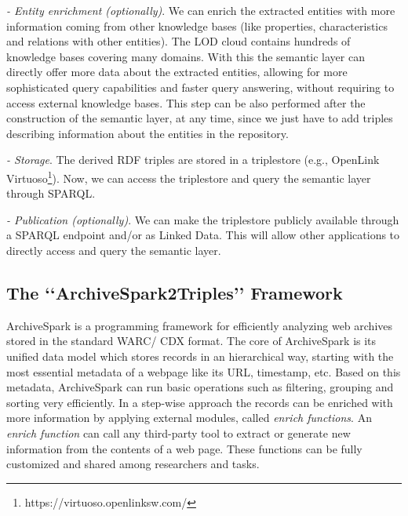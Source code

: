 \documentclass{libtex/sig-alternate-05-2015}
\newcommand{\q}[1]{\lq\lq{}{}#1\rq\rq{}{}}
\begin{document}
\vspace{0.5mm} \noindent
{\em - Entity enrichment (optionally)}.
We can enrich the extracted entities with more
information coming from other knowledge bases
(like properties, characteristics and relations with other entities).
The LOD cloud contains hundreds of knowledge bases covering many domains.
With this the semantic layer can directly offer more data about the extracted entities,
allowing for more sophisticated query capabilities
and faster query answering, without requiring
to access external knowledge bases.
This step can be also performed after the construction
of the semantic layer, at any time, since we
just have to add triples describing information about
the entities in the repository.

\vspace{0.5mm} \noindent
{\em - Storage}.
The derived RDF triples are stored in a triplestore
(e.g., OpenLink Virtuoso\footnote{https://virtuoso.openlinksw.com/}).
Now, we can access the triplestore and query the semantic layer
through SPARQL.

\vspace{0.5mm} \noindent
{\em - Publication (optionally)}.
We can make the triplestore publicly available through
a SPARQL endpoint and/or as Linked Data.
This will allow other applications to directly access and query
the semantic layer.



\subsection{The \q{ArchiveSpark2Triples} Framework}
\label{subsec:framework}

ArchiveSpark \cite{holzmann2016archivespark}
is a programming framework for efficiently analyzing
web archives stored in the standard WARC/ CDX format.
The core of ArchiveSpark is its unified data model
which stores records in an hierarchical way,
starting with the most essential metadata of a webpage like its URL, timestamp, etc.
Based on this metadata, ArchiveSpark can run basic operations
such as filtering, grouping and sorting very efficiently.
In a step-wise approach the records can be enriched
with more information by applying external modules,
called \textit{enrich functions}.
An \textit{enrich function} can call any third-party tool
to extract or generate new information from the contents of a web page.
These functions can be fully customized and shared among researchers and tasks.
\end{document}
